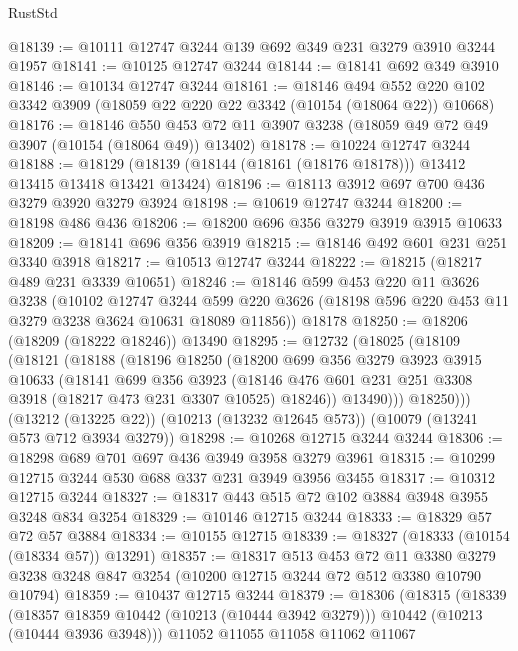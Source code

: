 \begin{lexlean}{RustStd}
\begin{coremodule}
{\begin{coremodule}
{{{{{{{{{{{{{{{{{{{{{{{{{{@18139 := @10111 @12747 @3244 @139 @692 @349 @231 @3279 @3910 @3244 @1957
@18141 := @10125 @12747 @3244
@18144 := @18141 @692 @349 @3910
@18146 := @10134 @12747 @3244
@18161 := @18146
    @494
    @552
    @220
    @102
    @3342
    @3909
    (@18059 @22 @220 @22 @3342 (@10154 (@18064 @22)) @10668)
@18176 := @18146
    @550
    @453
    @72
    @11
    @3907
    @3238
    (@18059 @49 @72 @49 @3907 (@10154 (@18064 @49)) @13402)
@18178 := @10224 @12747 @3244
@18188 := @18129 (@18139 (@18144 (@18161 (@18176 @18178))) @13412 @13415 @13418 @13421 @13424)
@18196 := @18113 @3912 @697 @700 @436 @3279 @3920 @3279 @3924
@18198 := @10619 @12747 @3244
@18200 := @18198 @486 @436
@18206 := @18200 @696 @356 @3279 @3919 @3915 @10633
@18209 := @18141 @696 @356 @3919
@18215 := @18146 @492 @601 @231 @251 @3340 @3918
@18217 := @10513 @12747 @3244
@18222 := @18215 (@18217 @489 @231 @3339 @10651)
@18246 := @18146
    @599
    @453
    @220
    @11
    @3626
    @3238
    (@10102
      @12747
      @3244
      @599
      @220
      @3626
      (@18198 @596 @220 @453 @11 @3279 @3238 @3624 @10631 @18089 @11856))
    @18178
@18250 := @18206 (@18209 (@18222 @18246)) @13490
@18295 := @12732
    (@18025
      (@18109
        (@18121
          (@18188
            (@18196
              @18250
              (@18200
                @699
                @356
                @3279
                @3923
                @3915
                @10633
                (@18141
                  @699
                  @356
                  @3923
                  (@18146 @476 @601 @231 @251 @3308 @3918 (@18217 @473 @231 @3307 @10525) @18246))
                @13490)))
          @18250)))
    (@13212 (@13225 @22))
    (@10213 (@13232 @12645 @573))
    (@10079 (@13241 @573 @712 @3934 @3279))
@18298 := @10268 @12715 @3244 @3244
@18306 := @18298 @689 @701 @697 @436 @3949 @3958 @3279 @3961
@18315 := @10299 @12715 @3244 @530 @688 @337 @231 @3949 @3956 @3455
@18317 := @10312 @12715 @3244
@18327 := @18317 @443 @515 @72 @102 @3884 @3948 @3955 @3248 @834 @3254
@18329 := @10146 @12715 @3244
@18333 := @18329 @57 @72 @57 @3884
@18334 := @10155 @12715
@18339 := @18327 (@18333 (@10154 (@18334 @57)) @13291)
@18357 := @18317
    @513
    @453
    @72
    @11
    @3380
    @3279
    @3238
    @3248
    @847
    @3254
    (@10200 @12715 @3244 @72 @512 @3380 @10790 @10794)
@18359 := @10437 @12715 @3244
@18379 := @18306
    (@18315
      (@18339
        (@18357 @18359 @10442 (@10213 (@10444 @3942 @3279)))
        @10442
        (@10213 (@10444 @3936 @3948)))
      @11052
      @11055
      @11058
      @11062
      @11067
}}}}}}}}}}}}}}}}}}}}}}}}}}
\end{coremodule}}
\end{coremodule}
\end{lexlean}
